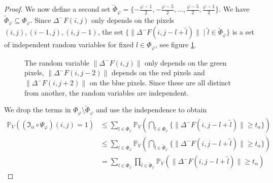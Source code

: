 \documentclass[a4paper,12pt]{article}
\newcommand{\norm}[1]{\lVert#1\rVert}
\theoremstyle{plain}
\theoremstyle{definition}
\begin{document}
\begin{proof}
	We now define a second set $\tilde{\Phi}_\varphi = \{ -\frac{\varphi - 1}{2}, -\frac{\varphi - 5}{2}, \dots, \frac{\varphi - 5}{2}, \frac{\varphi - 1}{2} \}$. We have $\tilde{\Phi}_\varphi \subseteq \Phi_\varphi$. Since $\Delta^- F(i, j)$ only depends on the pixels $(i, j), (i - 1, j), (i, j - 1)$, the set $\{ \norm{\Delta^- F(i, j - l + \tilde{l})} \mid \tilde{l} \in \tilde{\Phi}_\varphi \}$ is a set of independent random variables for fixed $l \in \Phi_\varphi$, see figure \ref{independentpoints}.
	
	\begin{figure}[h]
		\centering
		\caption{The random variable $\norm{\Delta^- F(i, j)}$ only depends on the green pixels, $\norm{\Delta^- F(i, j - 2)}$ depends on the red pixels and $\norm{\Delta^- F(i, j + 2)}$ on the blue pixels. Since these are all distinct from another, the random variables are independent.}
		\label{independentpoints}
	\end{figure}
	
	We drop the terms in $\Phi_\varphi \setminus \tilde{\Phi}_\varphi$ and use the independence to obtain
	\begin{align*}
		\mathbb{P}_V( (\mathfrak{I}_\alpha \circ \Psi_\varphi)(i, j) = 1 ) &\leq \sum_{l \in \Phi_\varphi} \mathbb{P}_V\left( \bigcap_{\tilde{l} \in \Phi_\varphi} \{ \norm{\Delta^- F(i, j - l + \tilde{l})} \geq t_\alpha \} \right) \\
		&\leq \sum_{l \in \Phi_\varphi} \mathbb{P}_V\left( \bigcap_{\tilde{l} \in \tilde{\Phi}_\varphi} \{ \norm{\Delta^- F(i, j - l + \tilde{l})} \geq t_\alpha \} \right) \\
		&= \sum_{l \in \Phi_\varphi} \prod_{\tilde{l} \in \tilde{\Phi}_\varphi} \mathbb{P}_V\left( \norm{\Delta^- F(i, j - l + \tilde{l})} \geq t_\alpha \right)
	\end{align*}
	

\end{proof}
\end{document}
